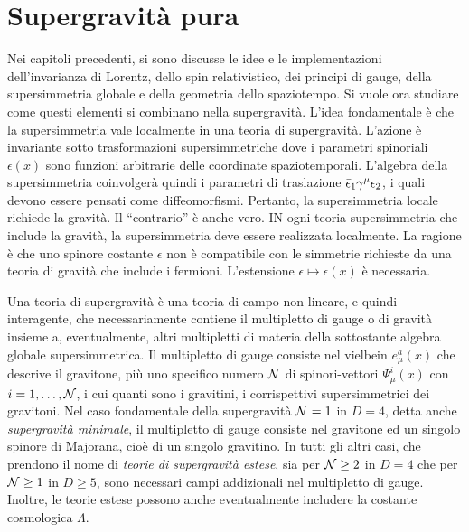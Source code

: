 \chapter{Supergravità pura}
Nei capitoli precedenti, si sono discusse le idee e le implementazioni dell'invarianza di Lorentz, dello spin relativistico, dei principi di gauge, della supersimmetria globale e della geometria dello spaziotempo. Si vuole ora studiare come questi elementi si combinano nella supergravità. L'idea fondamentale è che la supersimmetria vale localmente in una teoria di supergravità. L'azione è invariante sotto trasformazioni supersimmetriche dove i parametri spinoriali $\epsilon(x)$ sono funzioni arbitrarie delle coordinate spaziotemporali. L'algebra della supersimmetria coinvolgerà quindi i parametri di traslazione $\bar{\epsilon}_1\gamma^\mu\epsilon_2$, i quali devono essere pensati come diffeomorfismi. Pertanto, la supersimmetria locale richiede la gravità. Il ``contrario'' è anche vero. IN ogni teoria supersimmetria che include la gravità, la supersimmetria deve essere realizzata localmente. La ragione è che uno spinore costante $\epsilon$ non è compatibile con le simmetrie richieste da una teoria di gravità che include i fermioni. L'estensione $\epsilon \mapsto \epsilon(x)$ è necessaria.

Una teoria di supergravità è una teoria di campo non lineare, e quindi interagente, che necessariamente contiene il multipletto di gauge o di gravità insieme a, eventualmente, altri multipletti di materia della sottostante algebra globale supersimmetrica. Il multipletto di gauge consiste nel vielbein $e^a_\mu(x)$ che descrive il gravitone, più uno specifico numero $\mathcal{N}$ di spinori-vettori $\Psi_\mu^i(x)$ con $i = 1,\dots,\mathcal{N}$, i cui quanti sono i gravitini, i corrispettivi supersimmetrici dei gravitoni. Nel caso fondamentale della supergravità $\mathcal{N} = 1$ in $D = 4$, detta anche \emph{supergravità minimale}, il multipletto di gauge consiste nel gravitone ed un singolo spinore di Majorana, cioè di un singolo gravitino. In tutti gli altri casi, che prendono il nome di \emph{teorie di supergravità estese}, sia per $\mathcal{N} \ge 2$ in $D = 4$ che per $\mathcal{N} \ge 1$ in $D \ge 5$, sono necessari campi addizionali nel multipletto di gauge. Inoltre, le teorie estese possono anche eventualmente includere la costante cosmologica $\Lambda$. 

